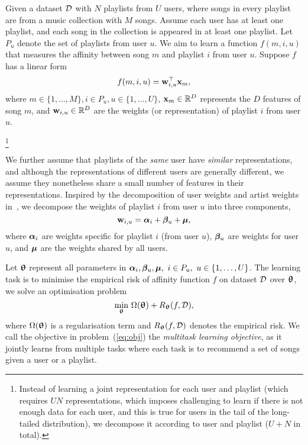 Given a dataset $\mathcal{D}$ with $N$ playlists from $U$ users, 
where songs in every playlist are from a music collection with $M$ songs.
Assume each user has at least one playlist, and each song in the collection 
is appeared in at least one playlist.
%
Let $P_u$ denote the set of playlists from user $u$.
We aim to learn a function $f(m, i, u)$ that measures the affinity between song $m$ and playlist $i$ from user $u$.
Suppose $f$ has a linear form
\begin{equation}
\label{eq:scorefunc}
f(m, i, u) = \mathbf{w}_{i,u}^\top \mathbf{x}_m,
\end{equation}
where $m \in \{1,\dots,M\}, i \in P_u, u \in \{1,\dots,U\}$,
$\mathbf{x}_m \in \mathbb{R}^D$ represents the $D$ features of song $m$,
and $\mathbf{w}_{i,u} \in \mathbb{R}^D$ are the weights (or representation) of playlist $i$ from user $u$.

\footnote{
Instead of learning a joint representation for each user and playlist (which requires $U N$ representations, 
which imposes challenging to learn if there is not enough data for each user, and this is true for users in the tail of the long-tailed distribution), 
we decompose it according to user and playlist ($U + N$ in total).
}

We further assume that playlists of the \emph{same} user have \emph{similar} representations,
and although the representations of different users are generally different,
we assume they nonetheless share a small number of features in their representations.
Inspired by the decomposition of user weights and artist weights in~\cite{ben2017groove},
we decompose the weights of playlist $i$ from user $u$ %
into three components, 
$$
\mathbf{w}_{i,u} = {\bm{\alpha}}_i + {\bm{\beta}}_u + \bm{\mu},
$$
where ${\bm{\alpha}}_i$ are weights specific for playlist $i$ (from user $u$),
${\bm{\beta}}_u$ are weights for user $u$,
and $\bm{\mu}$ are the weights shared by all users.


Let ${\bm{\uptheta}}$ represent all parameters in $\alphabm_i, \betabm_u, \bmu, \ i \in P_u, \ u \in \{1,\dots,U\}$.
The learning task is to minimise the empirical risk of affinity function $f$ on dataset $\mathcal{D}$ over ${\bm{\uptheta}}$,
\ie we solve an optimisation problem
\begin{equation}
\label{eq:obj}
\min_{\bm{\uptheta}} \, \Omega({\bm{\uptheta}}) + R_{\bm{\uptheta}}(f, \mathcal{D}),
\end{equation}
where $\Omega({\bm{\uptheta}})$ is a regularisation term and $R_{\bm{\uptheta}}(f, \mathcal{D})$ denotes the empirical risk.
We call the objective in problem~(\ref{eq:obj}) the {\it multitask learning objective},
as it jointly learns from multiple tasks where each task is to recommend a set of songs given a user or a playlist.


